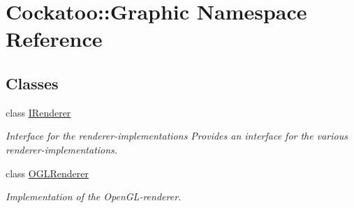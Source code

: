 \hypertarget{namespaceCockatoo_1_1Graphic}{}\section{Cockatoo\+:\+:Graphic Namespace Reference}
\label{namespaceCockatoo_1_1Graphic}
\subsection*{Classes}
\begin{DoxyCompactItemize}
\item 
class \hyperlink{classCockatoo_1_1Graphic_1_1IRenderer}{I\+Renderer}
\begin{DoxyCompactList}\small\item\em Interface for the renderer-\/implementations Provides an interface for the various renderer-\/implementations. \end{DoxyCompactList}\item 
class \hyperlink{classCockatoo_1_1Graphic_1_1OGLRenderer}{O\+G\+L\+Renderer}
\begin{DoxyCompactList}\small\item\em Implementation of the Open\+G\+L-\/renderer. \end{DoxyCompactList}\end{DoxyCompactItemize}
